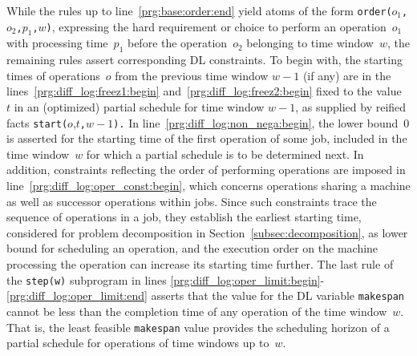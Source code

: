 \documentclass{tlp} %
\begin{document}
While the rules up to line~\ref{prg:base:order:end} yield atoms of the form
\lstinline{order(}$o_1$\lstinline{,}$o_2$\lstinline{,}$p_1$\lstinline{,}$w$\lstinline{)},
expressing the hard requirement or choice to perform an operation~$o_1$
with processing time~$p_1$ before the operation~$o_2$ belonging to time window~$w$,
the remaining rules assert corresponding DL constraints. %
To begin with,
the starting times of operations~$o$ from the previous time window $w-1$ (if any)
are in the lines~\ref{prg:diff_log:freez1:begin} and~\ref{prg:diff_log:freez2:begin}
fixed to the value~$t$ in an (optimized) partial schedule for time window $w-1$, 
as supplied by reified facts \lstinline{start(}$o${,}$t$\lstinline{,}$w-1$\lstinline{).}
In line~\ref{prg:diff_log:non_nega:begin},
the lower bound~$0$ is asserted for the starting time of the first operation of some job,
included in the time window~$w$ for which a partial schedule is to be determined next.
In addition, constraints reflecting the order of performing operations are imposed 
in line~\ref{prg:diff_log:oper_const:begin},
which concerns operations sharing a machine as well as successor operations within jobs.
Since such constraints trace the sequence of operations in a job, they establish the
earliest starting time, considered for problem decomposition in Section~\ref{subsec:decomposition},
as lower bound for scheduling an operation, and the execution order on the machine
processing the operation can increase its starting time further.
The last rule of the \lstinline{step(w)} subprogram in lines
\ref{prg:diff_log:oper_limit:begin}-\ref{prg:diff_log:oper_limit:end} asserts
that the value for the DL variable \lstinline{makespan} cannot be less than the
completion time of any operation of the time window~$w$.
That is, the least feasible \lstinline{makespan} value provides the
scheduling horizon of a partial schedule for operations of time windows up to~$w$.
\end{document}
